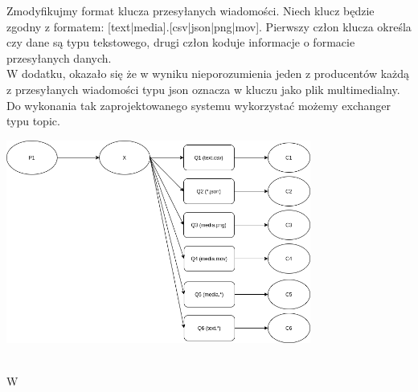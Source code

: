 \documentclass{article}
\begin{document}
        Zmodyfikujmy format klucza przesyłanych wiadomości. Niech klucz będzie zgodny z formatem: [text|media].[csv|json|png|mov]. Pierwszy człon klucza określa czy dane są typu tekstowego, drugi człon koduje informacje o formacie przesyłanych danych.\\
        W dodatku, okazało się że w wyniku nieporozumienia jeden z producentów każdą z przesyłanych wiadomości typu json oznacza w kluczu jako plik multimedialny.
        Do wykonania tak zaprojektowanego systemu wykorzystać możemy exchanger typu topic. 
        \begin{center}
            \includegraphics[width=10cm]{lab2/report/ex3_2.png}
        \end{center}\\
        W

        
\end{document}
